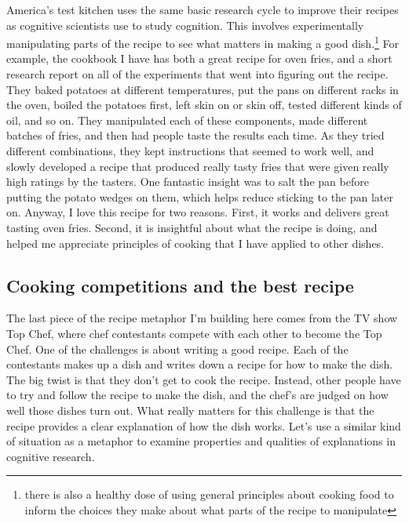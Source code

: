 \documentclass[
  oneside,
  12pt]{crumpbook}
\begin{document}
America's test kitchen uses the same basic research cycle to improve their recipes as cognitive scientists use to study cognition. This involves experimentally manipulating parts of the recipe to see what matters in making a good dish.\footnote{there is also a healthy dose of using general principles about cooking food to inform the choices they make about what parts of the recipe to manipulate} For example, the cookbook I have has both a great recipe for oven fries, and a short research report on all of the experiments that went into figuring out the recipe. They baked potatoes at different temperatures, put the pans on different racks in the oven, boiled the potatoes first, left skin on or skin off, tested different kinds of oil, and so on. They manipulated each of these components, made different batches of fries, and then had people taste the results each time. As they tried different combinations, they kept instructions that seemed to work well, and slowly developed a recipe that produced really tasty fries that were given really high ratings by the tasters. One fantastic insight was to salt the pan before putting the potato wedges on them, which helps reduce sticking to the pan later on. Anyway, I love this recipe for two reasons. First, it works and delivers great tasting oven fries. Second, it is insightful about what the recipe is doing, and helped me appreciate principles of cooking that I have applied to other dishes.

\hypertarget{cooking-competitions-and-the-best-recipe}{%
\subsection{Cooking competitions and the best recipe}\label{cooking-competitions-and-the-best-recipe}}

The last piece of the recipe metaphor I'm building here comes from the TV show Top Chef, where chef contestants compete with each other to become the Top Chef. One of the challenges is about writing a good recipe. Each of the contestants makes up a dish and writes down a recipe for how to make the dish. The big twist is that they don't get to cook the recipe. Instead, other people have to try and follow the recipe to make the dish, and the chef's are judged on how well those dishes turn out. What really matters for this challenge is that the recipe provides a clear explanation of how the dish works. Let's use a similar kind of situation as a metaphor to examine properties and qualities of explanations in cognitive research.
\end{document}
